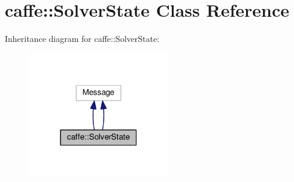 \hypertarget{classcaffe_1_1_solver_state}{}\section{caffe\+:\+:Solver\+State Class Reference}
\label{classcaffe_1_1_solver_state}


Inheritance diagram for caffe\+:\+:Solver\+State\+:
\nopagebreak
\begin{figure}[H]
\begin{center}
\leavevmode
\includegraphics[width=175pt]{classcaffe_1_1_solver_state__inherit__graph}
\end{center}
\end{figure}
